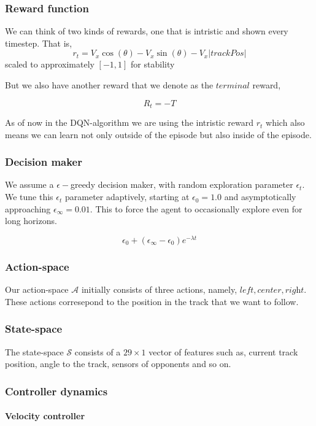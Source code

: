 \documentclass{article}
\begin{document}
\subsubsection{Reward function}

We can think of two kinds of rewards, one that is intristic and shown every timestep. That is,  
\[
r_t = V_x \cos(\theta) - V_x\sin(\theta)-V_x|trackPos|
\]
scaled to approximately $[-1,1]$ for stability

But we also have another reward that we denote as the $\textit{terminal}$ reward,

\[
R_t = -T
\]

As of now in the DQN-algorithm we are using the intristic reward $r_t$ which also means we can learn not only outside of the episode but also inside of the episode.

\subsubsection{Decision maker}
We assume a $\epsilon-$greedy decision maker, with random exploration parameter $\epsilon_t$. We tune this $\epsilon_t$ parameter adaptively, starting at $\epsilon_0 = 1.0$ and asymptotically approaching $\epsilon_\infty = 0.01$. This to force the agent to occasionally explore even for long horizons.

\[
	\epsilon_0 + (\epsilon_\infty - \epsilon_0) e^{-\lambda t}
\]


\subsubsection{Action-space}
Our action-space $\mathcal{A}$ initially consists of three actions, namely, $\textit{left}, \textit{center}, \textit{right}$. These actions corresepond to the position in the track that we want to follow. 

\subsubsection{State-space}
The state-space $\mathcal{S}$ consists of a $29\times1$ vector of features such as, current track position, angle to the track, sensors of opponents and so on.

\subsubsection{Controller dynamics}

\paragraph{Velocity controller}
\end{document}
